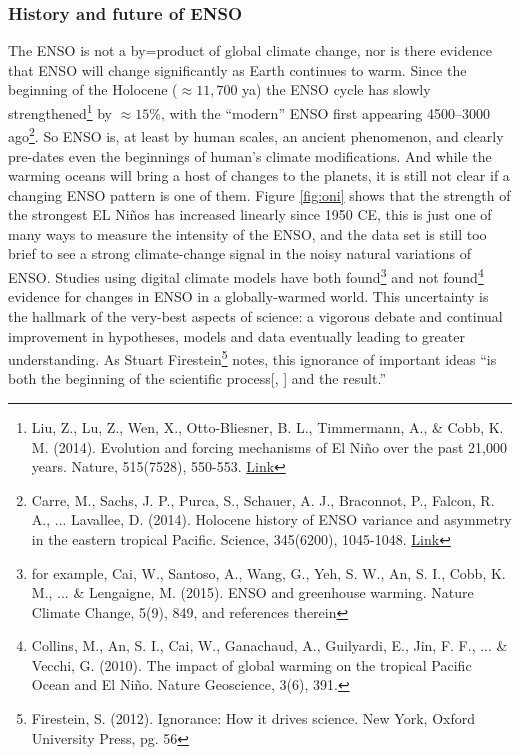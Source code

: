 {\subsubsection{History and future of ENSO}
The ENSO is not a by=product of global climate change, nor is there evidence that ENSO will change significantly as Earth continues to warm. Since the beginning of the Holocene ($\approx 11,700$ ya) the ENSO cycle has slowly strengthened\footnote{Liu, Z., Lu, Z., Wen, X., Otto-Bliesner, B. L., Timmermann, A., \& Cobb, K. M. (2014). Evolution and forcing mechanisms of El Ni\~no over the past 21,000 years. Nature, 515(7528), 550-553. \href{https://doi.org/10.1038/nature13963}{Link}} by $\approx 15\%$, with the ``modern'' ENSO first appearing  \SIrange{4500}{3000}{\year} ago\footnote{Carre, M., Sachs, J. P., Purca, S., Schauer, A. J., Braconnot, P., Falcon, R. A., ... Lavallee, D. (2014). Holocene history of ENSO variance and asymmetry in the eastern tropical Pacific. Science, 345(6200), 1045-1048. \href{https://doi.org/10.1126/science.1252220}{Link}}. So ENSO is, at least by human scales, an ancient phenomenon, and clearly pre-dates even the beginnings of human's climate modifications. And while the warming oceans will bring a host of changes to the planets, it is still not clear if a changing ENSO pattern is one of them. Figure \ref{fig:oni} shows that the strength of the strongest EL Ni\~nos has increased linearly since 1950 CE, this is just one of many ways to measure the intensity of the ENSO, and the data set is still too brief to see a strong climate-change signal in the noisy natural variations of ENSO. Studies using digital climate models have both found\footnote{for example, Cai, W., Santoso, A., Wang, G., Yeh, S. W., An, S. I., Cobb, K. M., ... \& Lengaigne, M. (2015). ENSO and greenhouse warming. Nature Climate Change, 5(9), 849, and references therein} and not found\footnote{Collins, M., An, S. I., Cai, W., Ganachaud, A., Guilyardi, E., Jin, F. F., ... \& Vecchi, G. (2010). The impact of global warming on the tropical Pacific Ocean and El Ni\~no. Nature Geoscience, 3(6), 391.} evidence for changes in ENSO in a globally-warmed world. This uncertainty is the hallmark of the very-best aspects of science: a vigorous debate and continual improvement in hypotheses, models and data eventually leading to greater understanding. As Stuart Firestein\footnote{Firestein, S. (2012). Ignorance: How it drives science. New York, Oxford University Press, pg. 56} notes, this ignorance of important ideas ``is both the beginning of the scientific process[, ] and the result.'' 
$\ $\\
}
